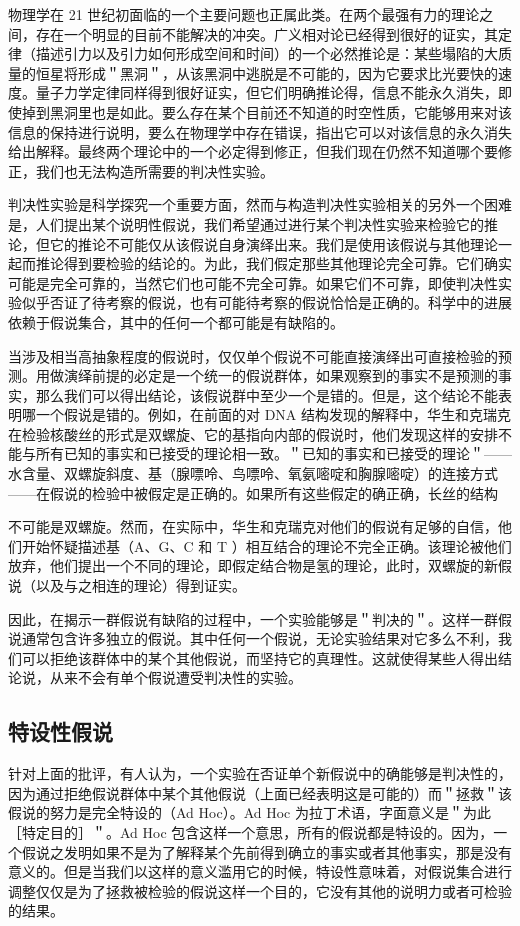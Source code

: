 物理学在 21 世纪初面临的一个主要问题也正属此类。在两个最强有力的理论之间，存在一个明显的目前不能解决的冲突。广义相对论已经得到很好的证实，其定律（描述引力以及引力如何形成空间和时间）的一个必然推论是：某些塌陷的大质量的恒星将形成＂黑洞＂，从该黑洞中逃脱是不可能的，因为它要求比光要快的速度。量子力学定律同样得到很好证实，但它们明确推论得，信息不能永久消失，即使掉到黑洞里也是如此。要么存在某个目前还不知道的时空性质，它能够用来对该信息的保持进行说明，要么在物理学中存在错误，指出它可以对该信息的永久消失给出解释。最终两个理论中的一个必定得到修正，但我们现在仍然不知道哪个要修正，我们也无法构造所需要的判决性实验。\cite{hawking1974}

判决性实验是科学探究一个重要方面，然而与构造判决性实验相关的另外一个困难是，人们提出某个说明性假说，我们希望通过进行某个判决性实验来检验它的推论，但它的推论不可能仅从该假说自身演绎出来。我们是使用该假说与其他理论一起而推论得到要检验的结论的。为此，我们假定那些其他理论完全可靠。它们确实可能是完全可靠的，当然它们也可能不完全可靠。如果它们不可靠，即使判决性实验似乎否证了待考察的假说，也有可能待考察的假说恰恰是正确的。科学中的进展依赖于假说集合，其中的任何一个都可能是有缺陷的。

当涉及相当高抽象程度的假说时，仅仅单个假说不可能直接演绎出可直接检验的预测。用做演绎前提的必定是一个统一的假说群体，如果观察到的事实不是预测的事实，那么我们可以得出结论，该假说群中至少一个是错的。但是，这个结论不能表明哪一个假说是错的。例如，在前面的对 DNA 结构发现的解释中，华生和克瑞克在检验核酸丝的形式是双螺旋、它的基指向内部的假说时，他们发现这样的安排不能与所有已知的事实和已接受的理论相一致。＂已知的事实和已接受的理论＂——水含量、双螺旋斜度、基（腺嘌呤、鸟嘌呤、氧氨嘧啶和胸腺嘧啶）的连接方式——在假说的检验中被假定是正确的。如果所有这些假定的确正确，长丝的结构

不可能是双螺旋。然而，在实际中，华生和克瑞克对他们的假说有足够的自信，他们开始怀疑描述基（A、G、C 和 T ）相互结合的理论不完全正确。该理论被他们放弃，他们提出一个不同的理论，即假定结合物是氢的理论，此时，双螺旋的新假说（以及与之相连的理论）得到证实。

因此，在揭示一群假说有缺陷的过程中，一个实验能够是＂判决的＂。这样一群假说通常包含许多独立的假说。其中任何一个假说，无论实验结果对它多么不利，我们可以拒绝该群体中的某个其他假说，而坚持它的真理性。这就使得某些人得出结论说，从来不会有单个假说遭受判决性的实验。

\subsection{特设性假说}
针对上面的批评，有人认为，一个实验在否证单个新假说中的确能够是判决性的，因为通过拒绝假说群体中某个其他假说（上面已经表明这是可能的）而＂拯救＂该假说的努力是完全特设的（Ad Hoc）。Ad Hoc 为拉丁术语，字面意义是＂为此［特定目的］＂。Ad Hoc 包含这样一个意思，所有的假说都是特设的。因为，一个假说之发明如果不是为了解释某个先前得到确立的事实或者其他事实，那是没有意义的。但是当我们以这样的意义滥用它的时候，特设性意味着，对假说集合进行调整仅仅是为了拯救被检验的假说这样一个目的，它没有其他的说明力或者可检验的结果。

